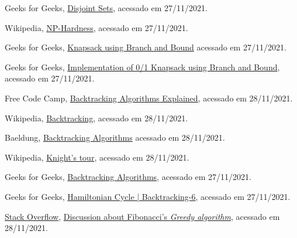 \begin{thebibliography}{10}

  Geeks for Geeks,
  \href{https://www.geeksforgeeks.org/disjoint-set-data-structures/}{Disjoint Sets},
  acessado em 27/11/2021.

  Wikipedia,
  \href{https://en.wikipedia.org/wiki/NP-hardness}{NP-Hardness},
  acessado em 27/11/2021.
  
  Geeks for Geeks,
  \href{https://www.geeksforgeeks.org/0-1-knapsack-using-branch-and-bound/}{Knapsack using Branch and Bound}
  acessado em 27/11/2021.
  
  Geeks for Geeks,
  \href{https://www.geeksforgeeks.org/implementation-of-0-1-knapsack-using-branch-and-bound/}{Implementation of 0/1 Knapsack using Branch and Bound},
  acessado em 27/11/2021.
  
  Free Code Camp,
  \href{https://www.freecodecamp.org/news/backtracking-algorithms-explained/}{Backtracking Algorithms Explained},
  acessado em 28/11/2021.

  Wikipedia,
  \href{https://en.wikipedia.org/wiki/Backtracking}{Backtracking},
  acessado em 28/11/2021.

  Baeldung,
  \href{https://www.baeldung.com/cs/backtracking-algorithms}{Backtracking Algorithms}
  acessado em 28/11/2021.

  Wikipedia,
  \href{https://en.wikipedia.org/wiki/Knight%27s_tour}{Knight's tour},
  acessado em 28/11/2021.

  Geeks for Geeks,
  \href{https://www.geeksforgeeks.org/backtracking-algorithms/#standard}{Backtracking Algorithms},
  acessado em 27/11/2021.

  Geeks for Geeks,
  \href{https://www.geeksforgeeks.org/hamiltonian-cycle-backtracking-6/}{Hamiltonian Cycle | Backtracking-6},
  acessado em 27/11/2021.


  \href{https://stackoverflow.com/}{Stack Overflow},
  \href{https://stackoverflow.com/questions/52869474/implementing-fibonacci-series-using-greedy-approach}{Discussion about Fibonacci's \emph{Greedy algorithm}},
  acessado em 28/11/2021. 


\end{thebibliography}
